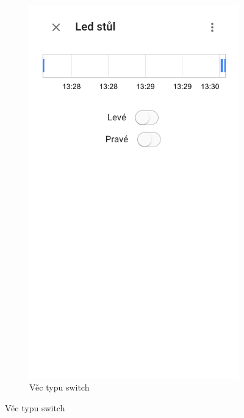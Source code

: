 \documentclass[thesis=B,czech]{FITthesis}[2019/12/23]
\begin{document}
\begin{figure}
    \centering
    \begin{subfigure}{.5\textwidth}
        \centering
        \includegraphics[width=0.75\linewidth]{img/screens/led.png}
        \caption{Věc typu switch}
    \end{subfigure}



\end{figure}
\end{document}
